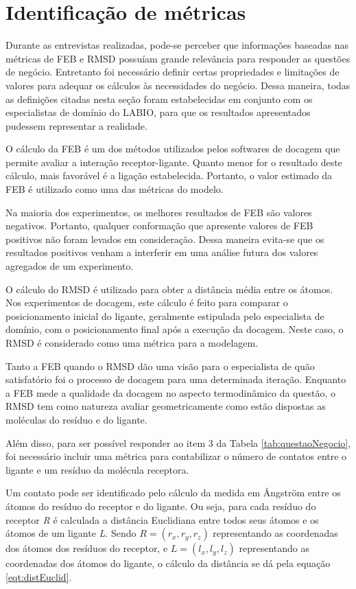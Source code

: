 \section{Identificação de métricas}

Durante as entrevistas realizadas, pode-se perceber que informações baseadas nas métricas de FEB e RMSD possuíam grande relevância para responder as questões de negócio. Entretanto foi necessário definir certas propriedades e limitações de valores para adequar os cálculos às necessidades do negócio. Dessa maneira, todas as definições citadas nesta seção foram estabelecidas em conjunto com os especialistas de domínio do LABIO, para que os resultados apresentados pudessem representar a realidade.

O cálculo da FEB é um dos métodos utilizados pelos softwares de docagem que permite avaliar a interação receptor-ligante. Quanto menor for o resultado deste cálculo, mais favorável é a ligação estabelecida. Portanto, o valor estimado da FEB é utilizado como uma das métricas do modelo.

Na maioria dos experimentos, os melhores resultados de FEB são valores negativos. Portanto, qualquer conformação que apresente valores de FEB positivos não foram levados em consideração. Dessa maneira evita-se que os resultados positivos venham a interferir em uma análise futura dos valores agregados de um experimento. 

O cálculo do RMSD é utilizado para obter a distância média entre os átomos. Nos experimentos de docagem, este cálculo é feito para comparar o posicionamento inicial do ligante, geralmente estipulada pelo especialista de domínio, com o posicionamento final após a execução da docagem. Neste caso, o RMSD é considerado como uma métrica para a modelagem.

Tanto a FEB quando o RMSD dão uma visão para o especialista de quão satisfatório foi o processo de docagem para uma determinada iteração. Enquanto a FEB mede a qualidade da docagem no aspecto termodinâmico da questão, o RMSD tem como natureza avaliar geometricamente como estão dispostas as moléculas do resíduo e do ligante.

Além disso, para ser possível responder ao item 3 da Tabela \ref{tab:questaoNegocio}, foi necessário incluir uma métrica para contabilizar o número de contatos entre o ligante e um resíduo da molécula receptora. 

Um contato pode ser identificado pelo cálculo da medida em {\AA}ngstr\"om entre os átomos do resíduo do receptor e do ligante. Ou seja, para cada resíduo do receptor \emph{R} é calculada a distância Euclidiana entre todos seus átomos e os átomos de um ligante \emph{L}. Sendo $R=(r_{x},r_{y},r_{z})$ representando as coordenadas dos átomos dos resíduos do receptor, e $L=(l_{x},l_{y},l_{z})$ representando as coordenadas dos átomos do ligante, o cálculo da distância se dá pela equação \ref{eqt:distEuclid}.

